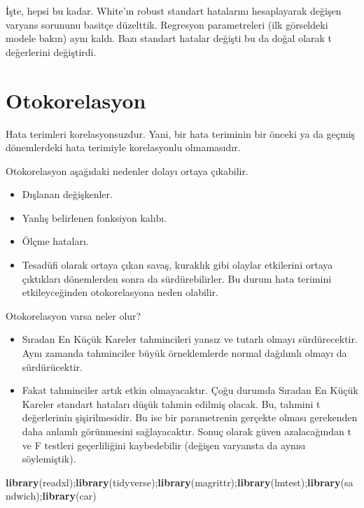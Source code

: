 \documentclass[
]{book}
\newenvironment{Shaded}{\begin{snugshade}}{\end{snugshade}}
\newcommand{\KeywordTok}[1]{\textcolor[rgb]{0.13,0.29,0.53}{\textbf{#1}}}
\newcommand{\NormalTok}[1]{#1}
\begin{document}
İşte, hepsi bu kadar. White'ın robust standart hatalarını hesaplayarak değişen varyans sorununu basitçe düzelttik. Regresyon parametreleri (ilk görseldeki modele bakın) aynı kaldı. Bazı standart hatalar değişti bu da doğal olarak t değerlerini değiştirdi.

\hypertarget{otokorelasyon}{%
\chapter{Otokorelasyon}\label{otokorelasyon}}

Hata terimleri korelasyonsuzdur. Yani, bir hata teriminin bir önceki ya da geçmiş dönemlerdeki hata terimiyle korelasyonlu olmamasıdır.

Otokorelasyon aşağıdaki nedenler dolayı ortaya çıkabilir.

\begin{itemize}
\item
  Dışlanan değişkenler.
\item
  Yanlış belirlenen fonksiyon kalıbı.
\item
  Ölçme hataları.
\item
  Tesadüfi olarak ortaya çıkan savaş, kuraklık gibi olaylar etkilerini ortaya çıktıkları dönemlerden sonra da sürdürebilirler. Bu durum hata terimini etkileyceğinden otokorelasyona neden olabilir.
\end{itemize}

Otokorelasyon varsa neler olur?

\begin{itemize}
\item
  Sıradan En Küçük Kareler tahmincileri yansız ve tutarlı olmayı sürdürecektir. Aynı zamanda tahminciler büyük örneklemlerde normal dağılımlı olmayı da sürdürücektir.
\item
  Fakat tahminciler artık etkin olmayacaktır. Çoğu durumda Sıradan En Küçük Kareler standart hataları düşük tahmin edilmiş olacak. Bu, tahmini t değerlerinin şişirilmesidir. Bu ise bir parametrenin gerçekte olması gerekenden daha anlamlı görünmesini sağlayacaktır. Sonuç olarak güven azalacağından t ve F testleri geçerliliğini kaybedebilir (değişen varyansta da aynısı söylemiştik).
\end{itemize}

\begin{Shaded}
\begin{Highlighting}[]
\KeywordTok{library}\NormalTok{(readxl);}\KeywordTok{library}\NormalTok{(tidyverse);}\KeywordTok{library}\NormalTok{(magrittr);}\KeywordTok{library}\NormalTok{(lmtest);}\KeywordTok{library}\NormalTok{(sandwich);}\KeywordTok{library}\NormalTok{(car)}
\end{Highlighting}
\end{Shaded}
\end{document}
